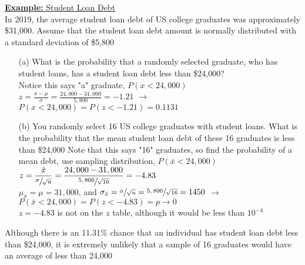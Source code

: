 \documentclass[a4paper]{article}
\let\bf\textbf
\begin{document}
\begin{shaded}
    \underline{\bf{Example:} Student Loan Debt}
    \vspace{2mm}\\
    In 2019, the average student loan debt of US college graduates was approximately \$31,000. Assume that the student loan debt amount is normally distributed with a standard deviation of \$5,800
    \begin{enumerate}
        \item[(a)] What is the probability that a randomly selected graduate, who has student loans, has a student loan debt less than \$24,000?
        \vspace{1mm}\\
        Notice this says "a" graduate, $P(x < 24,000)$\\
        $\displaystyle z = \frac{x - \mu}{\sigma} = \frac{24,000 - 31,000}{5,800} = -1.21$ \hspace{2mm}$\to$\hspace{2mm} $P(x < 24,000) = P(z < -1.21) = 0.1131$
        \item[(b)] You randomly select 16 US college graduates with student loans. What is the probability that the mean student loan debt of these 16 graduates is less than \$24,000
        \vspace{1mm}
        Note that this says "16" graduates, so find the probability of a mean debt, use sampling distribution, $P(\bar{x} < 24,000)$\\
        $\displaystyle z = \frac{\bar{x}}{\sfrac{\sigma}{\sqrt{n}}} = \frac{24,000 - 31,000}{\sfrac{5,800}{\sqrt{16}}} = -4.83$\\
        $\displaystyle \mu_{\bar{x}} = \mu = 31,000$, and $\displaystyle \sigma_{\bar{x}} = \sfrac{\sigma}{\sqrt{n}} = \sfrac{5,800}{\sqrt{16}} = 1450$ \hspace{2mm}$\to$\hspace{2mm} $P(\bar{x} < 24,000) = P(z < -4.83) = p\to0$\vspace{1mm}\\
        $z = -4.83$ is not on the $z$ table, although it would be less than $10^{-4}$
    \end{enumerate}
    Although there is an 11.31\% chance that an individual has student loan debt less than \$24,000, it is extremely unlikely that a sample of 16 graduates would have an average of less than 24,000
\end{shaded}
\end{document}

